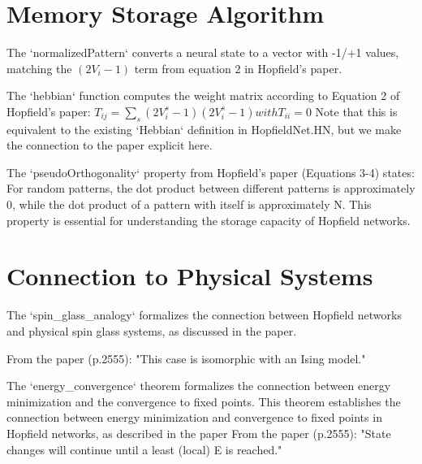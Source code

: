 \section{Memory Storage Algorithm}

\begin{definition}\label{normalizedPattern}
\leanok
The `normalizedPattern` converts a neural state to a vector with -1/+1 values,
matching the $(2V_i - 1)$ term from equation 2 in Hopfield's paper.
\end{definition}

\begin{definition}\label{hebbian}
\leanok
The `hebbian` function computes the weight matrix according to Equation 2 of Hopfield's paper:
    $T_{ij} = \sum_{s} (2V_{i}^s - 1)(2V_{i}^s - 1) with T_{ii} = 0$
Note that this is equivalent to the existing `Hebbian` definition in HopfieldNet.HN,
but we make the connection to the paper explicit here.
\end{definition}

\begin{definition}\label{isPseudoOrthogonal}
\leanok
The `pseudoOrthogonality` property from Hopfield's paper (Equations 3-4) states:
For random patterns, the dot product between different patterns is approximately 0,
while the dot product of a pattern with itself is approximately N.
This property is essential for understanding the storage capacity of Hopfield networks.
\end{definition}


\section{Connection to Physical Systems}

\begin{definition}\label{spin_glass_analogy}
The `spin\_glass\_analogy` formalizes the connection between Hopfield networks and
physical spin glass systems, as discussed in the paper.

From the paper (p.2555): "This case is isomorphic with an Ising model."
\end{definition}

\begin{definition}\label{energy_convergence}
The `energy\_convergence` theorem formalizes the connection between energy minimization
and the convergence to fixed points.
This theorem establishes the connection between energy minimization and convergence
to fixed points in Hopfield networks, as described in the paper
From the paper (p.2555): "State changes will continue until a least (local) E is reached."
\end{definition}



